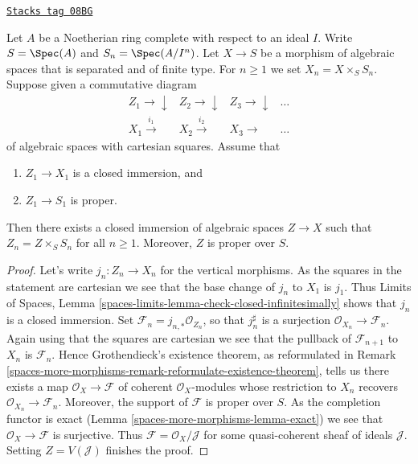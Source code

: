 \begin{lemma}
\label{spaces-more-morphisms-lemma-algebraize-formal-closed-subscheme}
\href{https://stacks.math.columbia.edu/tag/08BG}{\texttt{Stacks tag 08BG}}

Let $A$ be a Noetherian ring complete with respect to an ideal $I$.
Write $S = \Spec(A)$ and $S_n = \Spec(A/I^n)$.
Let $X \to S$ be a morphism of algebraic spaces that is separated
and of finite type.
For $n \geq 1$ we set $X_n = X \times_S S_n$.
Suppose given a commutative diagram
$$
\begin{array}{cccc}Z_1 \longrightarrow\downarrow & Z_2 \longrightarrow\downarrow & Z_3 \longrightarrow\downarrow & \ldots \\ X_1 \overset{i_1}{\longrightarrow} & X_2 \overset{i_2}{\longrightarrow} & X_3 \longrightarrow & \ldots\end{array}
$$
of algebraic spaces with cartesian squares. Assume that
\begin{enumerate}
\item $Z_1 \to X_1$ is a closed immersion, and
\item $Z_1 \to S_1$ is proper.
\end{enumerate}
Then there exists a closed immersion of algebraic spaces $Z \to X$ such that
$Z_n = Z \times_S S_n$ for all $n \geq 1$. Moreover, $Z$ is proper over $S$.
\end{lemma}

\begin{proof}
Let's write $j_n : Z_n \to X_n$ for the vertical morphisms.
As the squares in the statement are cartesian
we see that the base change of $j_n$ to $X_1$ is $j_1$.
Thus Limits of Spaces, Lemma
\ref{spaces-limits-lemma-check-closed-infinitesimally}
shows that $j_n$ is a closed immersion.
Set $\mathcal{F}_n = j_{n, *}\mathcal{O}_{Z_n}$, so that
$j_n^\sharp$ is a surjection $\mathcal{O}_{X_n} \to \mathcal{F}_n$.
Again using that the squares are cartesian we see that
the pullback of $\mathcal{F}_{n + 1}$ to $X_n$ is $\mathcal{F}_n$.
Hence Grothendieck's existence theorem, as reformulated in
Remark \ref{spaces-more-morphisms-remark-reformulate-existence-theorem},
tells us there exists a map
$\mathcal{O}_X \to \mathcal{F}$
of coherent $\mathcal{O}_X$-modules whose restriction to
$X_n$ recovers $\mathcal{O}_{X_n} \to \mathcal{F}_n$.
Moreover, the support of $\mathcal{F}$ is proper over $S$.
As the completion functor is exact (Lemma \ref{spaces-more-morphisms-lemma-exact})
we see that $\mathcal{O}_X \to \mathcal{F}$
is surjective. Thus $\mathcal{F} = \mathcal{O}_X/\mathcal{J}$
for some quasi-coherent sheaf of ideals $\mathcal{J}$.
Setting $Z = V(\mathcal{J})$ finishes the proof.
\end{proof}

